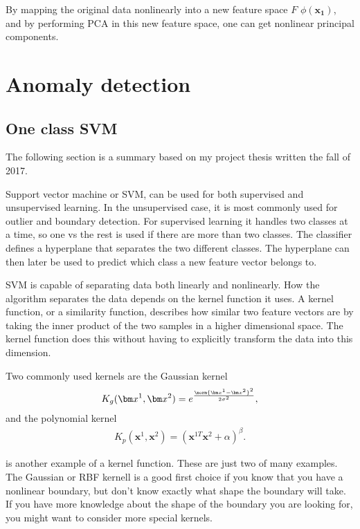         By mapping the original data nonlinearly into a new feature space $F$ $\phi(\bm{x_1})$, and by performing PCA in this new feature space, one can get nonlinear principal components.

\section{Anomaly detection}\label{sec:Anomaly_detection}
    
    \subsection{One class SVM}\label{subsec:OCSVM}
    
            The following section is a summary based on my project thesis written the fall of 2017.
            
            Support vector machine or SVM, can be used for both supervised and unsupervised learning. In the unsupervised case, it is most commonly used for outlier and boundary detection. For supervised learning it handles two classes at a time, so one vs the rest is used if there are more than two classes. The classifier defines a hyperplane that separates the two different classes. The hyperplane can then later be used to predict which class a new feature vector belongs to.  
            
            SVM is capable of separating data both linearly and nonlinearly. How the algorithm separates the data depends on the kernel function it uses. A kernel function, or a similarity function, describes how similar two feature vectors are by taking the inner product of the two samples in a higher dimensional space. The kernel function does this without having to explicitly transform the data into this dimension.
            
            Two commonly used kernels are the Gaussian kernel
            \begin{align}
                K_g(\bm x^{1},\bm x^{2}) = e^{\frac{\norm{\bm x^{1}-\bm x^{2}}^2}{2\sigma^2}}, 
                \label{svm:gauss}
            \end{align}
            and the polynomial kernel
            \begin{align}
                K_p(\bm x^{1},\bm x^{2}) = (\bm x^{1T}\bm x^{2} + \alpha)^\beta.
                \label{svm:poly}
            \end{align}
            
            is another example of a kernel function. These are just two of many examples. The Gaussian or RBF kernell is a good first choice if you know that you have a nonlinear boundary, but don't know exactly what shape the boundary will take. If you have more knowledge about the shape of the boundary you are looking for, you might want to consider more special kernels.
    
